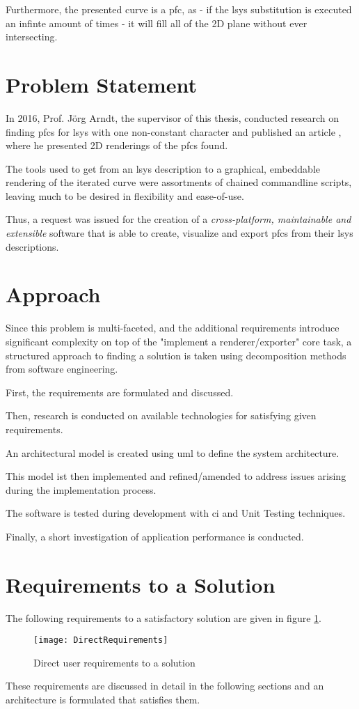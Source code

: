 Furthermore, the presented curve is a \gls{pfc}, as - if the \gls{lsys} substitution is executed an infinte amount of times - it will fill all of the 2D plane without ever intersecting.

\section{Problem Statement}
In 2016, Prof. Jörg Arndt, the supervisor of this thesis, conducted research on finding \gls{pfc}s for \gls{lsys} with one non-constant character and published an article \citep{Arndt2016}, where he presented 2D renderings of the \gls{pfc}s found.

The tools used to get from an \gls{lsys} description to a graphical, embeddable rendering of the iterated curve were assortments of chained commandline scripts, leaving much to be desired in flexibility and ease-of-use.

Thus, a request was issued for the creation of a \emph{cross-platform, maintainable and extensible} software that is able to create, visualize and export \gls{pfc}s from their \gls{lsys} descriptions.

\section{Approach}

Since this problem is multi-faceted, and the additional requirements introduce significant complexity on top of the "implement a renderer/exporter" core task, a structured approach to finding a solution is taken using decomposition methods from software engineering.

First, the requirements are formulated and discussed.

Then, research is conducted on available technologies for satisfying given requirements.

An architectural model is created using \gls{uml} to define the system architecture.

This model ist then implemented and refined/amended to address issues arising during the implementation process.

The software is tested during development with \gls{ci} and \gls{Unit Testing} techniques.

Finally, a short investigation of application performance is conducted.

\section{Requirements to a Solution}
The following requirements to a satisfactory solution are given in figure \ref{img1}.

\begin{figure}[h]
	\texttt{[image: DirectRequirements]}
	\caption{Direct user requirements to a solution}
	\label{img1}
\end{figure}

These requirements are discussed in detail in the following sections and an architecture is formulated that satisfies them.
